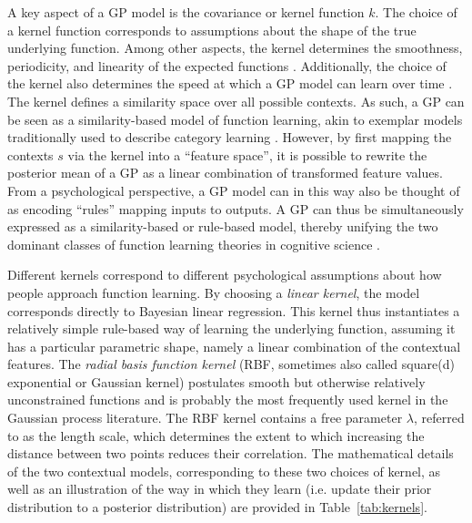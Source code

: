 \documentclass[a4paper,natbib]{apa6}
\begin{document}
A key aspect of a GP model is the covariance or kernel function $k$. The choice of a kernel function corresponds to assumptions about the shape of the true underlying function. Among other aspects, the kernel determines the smoothness, periodicity, and linearity of the expected functions \citep[c.f.][]{schulz2016probing}. Additionally, the choice of the kernel also determines the speed at which a GP model can learn over time \citep{schulzassessing}. The kernel defines a similarity space over all possible contexts. As such, a GP can be seen as a similarity-based model of function learning, akin to exemplar models traditionally used to describe category learning \citep{Nosofsky86}. However, by first mapping the contexts $s$ via the kernel into a ``feature space'', it is possible to rewrite the posterior mean of a GP as a linear combination of transformed feature values. From a psychological perspective, a GP model can in this way also be thought of as encoding ``rules'' mapping inputs to outputs. 
A GP can thus be simultaneously expressed as a similarity-based or rule-based model, thereby unifying the two dominant classes of function learning theories in cognitive science \citep[for more details, see][]{lucas2015rational}.

Different kernels correspond to different psychological assumptions about how people approach function learning. By choosing a \emph{linear kernel}, the model corresponds directly to Bayesian linear regression. This kernel thus instantiates a relatively simple rule-based way of learning the underlying function, assuming it has a particular parametric shape, namely a linear combination of the contextual features. The \emph{radial basis function kernel} (RBF, sometimes also called square(d) exponential or Gaussian kernel) postulates smooth but otherwise relatively unconstrained functions and is probably the most frequently used kernel in the Gaussian process literature. The RBF kernel contains a free parameter $\lambda$, referred to as the length scale, which determines the extent to which increasing the distance between two points reduces their correlation. The mathematical details of the two contextual models, corresponding to these two choices of kernel, as well as an illustration of the way in which they learn (i.e. update their prior distribution to a posterior distribution) are provided in Table~\ref{tab:kernels}.
\end{document}
